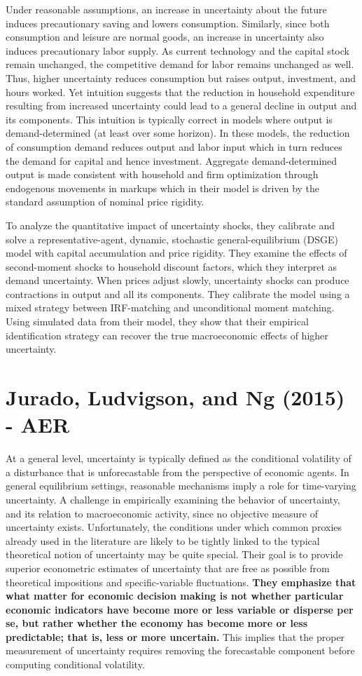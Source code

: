 \documentclass{article}
\begin{document}
{Under reasonable assumptions, an increase in uncertainty about the future induces precautionary saving and lowers consumption. Similarly, since both consumption and leisure are normal goods, an increase in uncertainty also induces precautionary labor supply. As current technology and the capital stock remain unchanged, the competitive demand for labor remains unchanged as well. Thus, higher uncertainty reduces consumption but raises output, investment, and hours worked. Yet intuition suggests that the reduction in household expenditure resulting from increased uncertainty could lead to a general decline in output and its components. This intuition is typically correct in models where output is demand-determined (at least over some horizon). In these models, the reduction of consumption demand reduces output and labor input which in turn reduces the demand for capital and hence investment. Aggregate demand-determined output is made consistent with household and firm optimization through endogenous movements in markups which in their model is driven by the standard assumption of nominal price rigidity.

To analyze the quantitative impact of uncertainty shocks, they calibrate and solve a representative-agent, dynamic, stochastic general-equilibrium (DSGE) model with capital accumulation and price rigidity. They examine the effects of second-moment shocks to household discount factors, which they interpret as demand uncertainty. When prices adjust slowly, uncertainty shocks can produce contractions in output and all its components. They calibrate the model using a mixed strategy between IRF-matching and unconditional moment matching. Using simulated data from their model, they show that their empirical identification strategy can recover the true macroeconomic effects of higher uncertainty. 


\section{Jurado, Ludvigson, and Ng (2015) - AER}


At a general level, uncertainty is typically defined as the conditional volatility of a disturbance that is unforecastable from the perspective of economic agents. In general equilibrium settings, reasonable mechanisms imply a role for time-varying uncertainty. A challenge in empirically examining the behavior of uncertainty, and its relation to macroeconomic activity, since no objective measure of uncertainty exists. Unfortunately, the conditions under which common proxies already used in the literature are likely to be tightly linked to the typical theoretical notion of uncertainty may be quite special. Their goal is to provide superior econometric estimates of uncertainty that are free as possible from theoretical impositions and specific-variable fluctuations. \textbf{They emphasize that what matter for economic decision making is not whether particular economic indicators have become more or less variable or disperse per se, but rather whether the economy has become more or less predictable; that is, less or more uncertain.} This implies that the proper measurement of uncertainty requires removing the forecastable component before computing conditional volatility.

}
\end{document}
